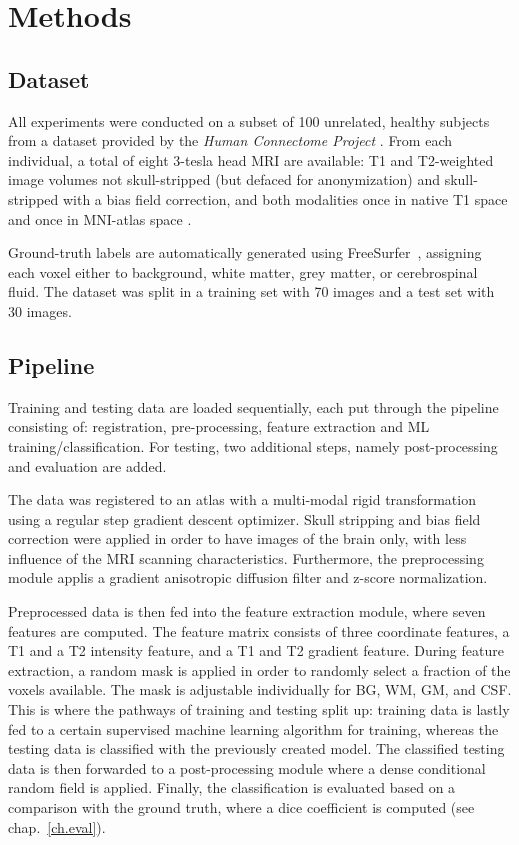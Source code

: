 \documentclass[journal]{IEEEtran}
\begin{document}
\section{Methods}

\subsection{Dataset}
All experiments were conducted on a subset of 100 unrelated, healthy subjects from a dataset provided by the \textit{Human Connectome Project} \cite{van2013wu}. From each individual, a total of eight 3-tesla head MRI are available: T1 and T2-weighted image volumes not skull-stripped (but defaced for anonymization) and skull-stripped with a bias field correction, and both modalities once in native T1 space and once in MNI-atlas space \cite{mazziotta2001probabilistic}.

Ground-truth labels are automatically generated using FreeSurfer~\cite{fischl2012freesurfer}, assigning each voxel either to background, white matter, grey matter, or cerebrospinal fluid. The dataset was split in a training set with 70 images and a test set with 30 images.

\subsection{Pipeline}\label{s.pipeline}

Training and testing data are loaded sequentially, each put through the pipeline consisting of: registration, pre-processing, feature extraction and ML training/classification. For testing, two additional steps, namely post-processing and evaluation are added.

The data was registered to an atlas with a multi-modal rigid transformation using a regular step gradient descent optimizer. Skull stripping and bias field correction were applied in order to have images of the brain only, with less influence of the MRI scanning characteristics. Furthermore, the preprocessing module applis a gradient anisotropic diffusion filter and z-score normalization.

Preprocessed data is then fed into the feature extraction module, where seven features are computed. The feature matrix consists of three coordinate features, a T1 and a T2 intensity feature, and a T1 and T2 gradient feature. During feature extraction, a random mask is applied in order to randomly select a fraction of the voxels available. The mask is adjustable individually for BG, WM, GM, and CSF. This is where the pathways of training and testing split up: training data is lastly fed to a certain supervised machine learning algorithm for training, whereas the testing data is classified with the previously created model. The classified testing data is then forwarded to a post-processing module where a dense conditional random field \cite{krahenbuhl2011efficient} is applied.
Finally, the classification is evaluated based on a comparison with the ground truth, where a dice coefficient is computed (see chap.~\ref{ch.eval}).
\end{document}
